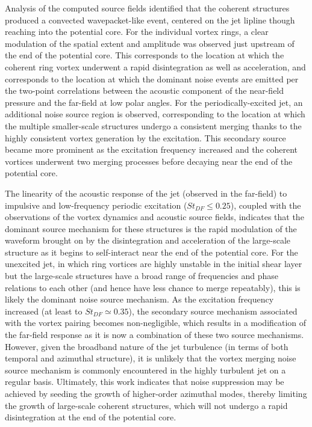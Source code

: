 Analysis of the computed source fields identified that the coherent structures produced a convected wavepacket-like event, centered on the jet lipline though reaching into the potential core.
For the individual vortex rings, a clear modulation of the spatial extent and amplitude was observed just upstream of the end of the potential core.
This corresponds to the location at which the coherent ring vortex underwent a rapid disintegration as well as acceleration, and corresponds to the location at which the dominant noise events are emitted per the two-point correlations between the acoustic component of the near-field pressure and the far-field at low polar angles.
For the periodically-excited jet, an additional noise source region is observed, corresponding to the location at which the multiple smaller-scale structures undergo a consistent merging thanks to the highly consistent vortex generation by the excitation.
This secondary source became more prominent as the excitation frequency increased and the coherent vortices underwent two merging processes before decaying near the end of the potential core.

The linearity of the acoustic response of the jet (observed in the far-field) to impulsive and low-frequency periodic excitation ($St_{DF} \leq 0.25$), coupled with the observations of the vortex dynamics and acoustic source fields, indicates that the dominant source mechanism for these structures is the rapid modulation of the waveform brought on by the disintegration and acceleration of the large-scale structure as it begins to self-interact near the end of the potential core.
For the unexcited jet, in which ring vortices are highly unstable in the initial shear layer but the large-scale structures have a broad range of frequencies and phase relations to each other (and hence have less chance to merge repeatably), this is likely the dominant noise source mechanism. 
As the excitation frequency increased (at least to $St_{DF} \simeq 0.35$), the secondary source mechanism associated with the vortex pairing becomes non-negligible, which results in a modification of the far-field response as it is now a combination of these two source mechanisms.
However, given the broadband nature of the jet turbulence (in terms of both temporal and azimuthal structure), it is unlikely that the vortex merging noise source mechanism is commonly encountered in the highly turbulent jet on a regular basis.
Ultimately, this work indicates that noise suppression may be achieved by seeding the growth of higher-order azimuthal modes, thereby limiting the growth of large-scale coherent structures, which will not undergo a rapid disintegration at the end of the potential core.  

